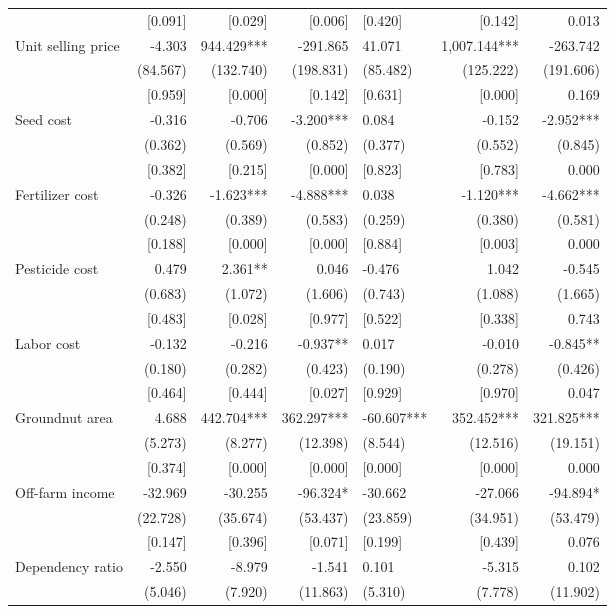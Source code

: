 \documentclass[
]{article}
\begin{document}
\begin{landscape}
\begin{ThreePartTable}
\begin{longtable}[t]{lrrrlrr}
 & {}[0.091] & {}[0.029] & {}[0.006] & {}[0.420] & {}[0.142] & 0.013\\
Unit selling price & -4.303 & 944.429*** & -291.865 & 41.071 & 1,007.144*** & -263.742\\
 & (84.567) & (132.740) & (198.831) & (85.482) & (125.222) & (191.606)\\
 & {}[0.959] & {}[0.000] & {}[0.142] & {}[0.631] & {}[0.000] & 0.169\\
Seed cost & -0.316 & -0.706 & -3.200*** & 0.084 & -0.152 & -2.952***\\
 & (0.362) & (0.569) & (0.852) & (0.377) & (0.552) & (0.845)\\
 & {}[0.382] & {}[0.215] & {}[0.000] & {}[0.823] & {}[0.783] & 0.000\\
Fertilizer cost & -0.326 & -1.623*** & -4.888*** & 0.038 & -1.120*** & -4.662***\\
 & (0.248) & (0.389) & (0.583) & (0.259) & (0.380) & (0.581)\\
 & {}[0.188] & {}[0.000] & {}[0.000] & {}[0.884] & {}[0.003] & 0.000\\
Pesticide cost & 0.479 & 2.361** & 0.046 & -0.476 & 1.042 & -0.545\\
 & (0.683) & (1.072) & (1.606) & (0.743) & (1.088) & (1.665)\\
 & {}[0.483] & {}[0.028] & {}[0.977] & {}[0.522] & {}[0.338] & 0.743\\
Labor cost & -0.132 & -0.216 & -0.937** & 0.017 & -0.010 & -0.845**\\
 & (0.180) & (0.282) & (0.423) & (0.190) & (0.278) & (0.426)\\
 & {}[0.464] & {}[0.444] & {}[0.027] & {}[0.929] & {}[0.970] & 0.047\\
Groundnut area & 4.688 & 442.704*** & 362.297*** & -60.607*** & 352.452*** & 321.825***\\
 & (5.273) & (8.277) & (12.398) & (8.544) & (12.516) & (19.151)\\
 & {}[0.374] & {}[0.000] & {}[0.000] & {}[0.000] & {}[0.000] & 0.000\\
Off-farm income & -32.969 & -30.255 & -96.324* & -30.662 & -27.066 & -94.894*\\
 & (22.728) & (35.674) & (53.437) & (23.859) & (34.951) & (53.479)\\
 & {}[0.147] & {}[0.396] & {}[0.071] & {}[0.199] & {}[0.439] & 0.076\\
Dependency ratio & -2.550 & -8.979 & -1.541 & 0.101 & -5.315 & 0.102\\
 & (5.046) & (7.920) & (11.863) & (5.310) & (7.778) & (11.902)\\

\end{longtable}
\end{ThreePartTable}
\end{landscape}
\end{document}

